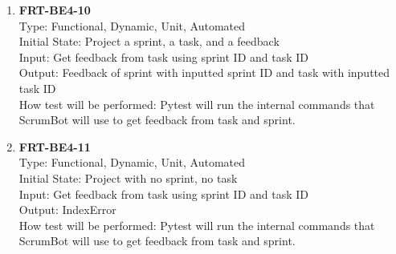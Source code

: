 \documentclass[12pt, titlepage]{article}
\begin{document}
\begin{enumerate}
    \item{\textbf{FRT-BE4-10}}\\
    Type: Functional, Dynamic, Unit, Automated\\
    Initial State: Project a sprint, a task, and a feedback\\
    Input: Get feedback from task using sprint ID and task ID\\
    Output: Feedback of sprint with inputted sprint ID and task with inputted task ID\\
    How test will be performed: Pytest will run the internal commands that ScrumBot will use to get feedback from task and sprint.
    
    \item{\textbf{FRT-BE4-11}}\\
    Type: Functional, Dynamic, Unit, Automated\\
    Initial State: Project with no sprint, no task\\
    Input: Get feedback from task using sprint ID and task ID\\
    Output: IndexError\\
    How test will be performed: Pytest will run the internal commands that ScrumBot will use to get feedback from task and sprint.
\end{enumerate}
\end{document}
